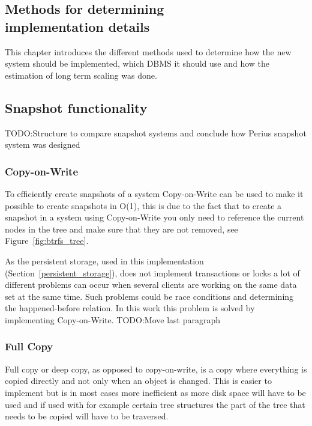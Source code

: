 \documentclass[a4paper,12pt]{article}
\newcommand{\fix}{\colorbox{yellow!30}{TODO:}}
\begin{document}
\subsection{Methods for determining\\implementation details}
This chapter introduces the different methods used to determine how the new system should be
implemented, which DBMS it should use and how the estimation of long term scaling was done.

\subsection{Snapshot functionality}
\fix Structure to compare snapshot systems and conclude how Perius snapshot system was designed
\subsubsection{Copy-on-Write}
\label{sec:copy-on-write}
To efficiently create snapshots of a system Copy-on-Write can be used to make it possible to create
snapshots in O(1)\cite{BTRFS}, this is due to the fact that to create a snapshot in a system using
Copy-on-Write you only need to reference the current nodes in the tree and make sure that they are
not removed, see Figure~\ref{fig:btrfs_tree}.

As the persistent storage, used in this implementation (Section~\ref{persistent_storage}), does not
implement transactions or locks a lot of different problems can occur when several clients are
working on the same data set at the same time. Such problems could be race conditions and
determining the happened-before relation. In this work this problem is solved by implementing
Copy-on-Write.
\fix Move last paragraph

\subsubsection{Full Copy}
Full copy or deep copy, as opposed to copy-on-write, is a copy where everything is copied directly
and not only when an object is changed. This is easier to implement but is in most cases more
inefficient as more disk space will have to be used and if used with for example certain tree 
structures the part of the tree that needs to be copied will have to be traversed. 
\end{document}

